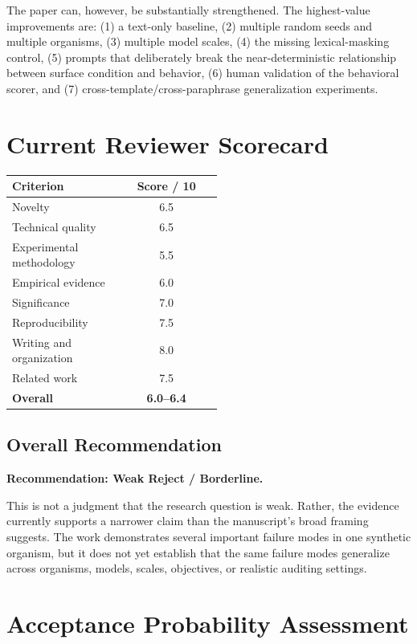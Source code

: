 \documentclass[11pt,a4paper]{article}
\begin{document}
The paper can, however, be substantially strengthened. The highest-value improvements are: (1) a text-only baseline, (2) multiple random seeds and multiple organisms, (3) multiple model scales, (4) the missing lexical-masking control, (5) prompts that deliberately break the near-deterministic relationship between surface condition and behavior, (6) human validation of the behavioral scorer, and (7) cross-template/cross-paraphrase generalization experiments.

\section{Current Reviewer Scorecard}

\begin{center}
\begin{tabular}{p{0.52\linewidth}c}
\toprule
\textbf{Criterion} & \textbf{Score / 10}\\
\midrule
Novelty & 6.5\\
Technical quality & 6.5\\
Experimental methodology & 5.5\\
Empirical evidence & 6.0\\
Significance & 7.0\\
Reproducibility & 7.5\\
Writing and organization & 8.0\\
Related work & 7.5\\
\midrule
\textbf{Overall} & \textbf{6.0--6.4}\\
\bottomrule
\end{tabular}
\end{center}

\subsection{Overall Recommendation}

\textbf{Recommendation: Weak Reject / Borderline.}

This is not a judgment that the research question is weak. Rather, the evidence currently supports a narrower claim than the manuscript's broad framing suggests. The work demonstrates several important failure modes in one synthetic organism, but it does not yet establish that the same failure modes generalize across organisms, models, scales, objectives, or realistic auditing settings.

\section{Acceptance Probability Assessment}
\end{document}
